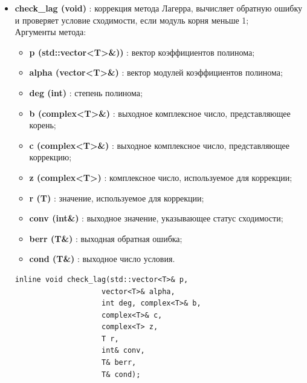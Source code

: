 \documentclass[a4paper,12pt]{article}
\begin{document}
\begin{itemize}
    \item \textbf{check\_lag (void)} : коррекция метода Лагерра, вычисляет обратную ошибку и проверяет условие сходимости, если модуль корня меньше 1;
    \\Аргументы метода:
    \begin{itemize}
        \renewcommand{\labelitemi}{-}
        \item \textbf{p (std::vector<T>\&))} : вектор коэффициентов полинома;
        \item \textbf{alpha (vector<T>\&)} : вектор модулей коэффициентов полинома;
        \item \textbf{deg (int)} : степень полинома;
        \item \textbf{b (complex<T>\&)} : выходное комплексное число, представляющее корень;
        \item \textbf{c (complex<T>\&)} : выходное комплексное число, представляющее коррекцию;
        \item \textbf{z (complex<T>)} : комплексное число, используемое для коррекции;
        \item \textbf{r (T)} : значение, используемое для коррекции;
        \item \textbf{conv (int\&)} : выходное значение, указывающее статус сходимости;
        \item \textbf{berr (T\&)} : выходная обратная ошибка;
        \item \textbf{cond (T\&)} : выходное число условия.
    \end{itemize}
\begin{lstlisting}[language=С++]
inline void check_lag(std::vector<T>& p, 
                    vector<T>& alpha, 
                    int deg, complex<T>& b, 
                    complex<T>& c, 
                    complex<T> z, 
                    T r, 
                    int& conv, 
                    T& berr, 
                    T& cond); \end{lstlisting}


\end{itemize}
\end{document}

